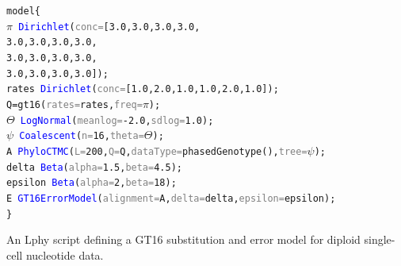 \documentclass[10pt,letterpaper,table]{article}
\theoremstyle{definition}
\begin{document}
\begin{example}[!h]
\small
\begin{alltt}
model \{
  \textcolor{bluishgreen}{\(\pi\)}  ~ \textcolor{blue}{Dirichlet}(\textcolor{gray}{conc=}[\textcolor{constant}{3.0}, \textcolor{constant}{3.0}, \textcolor{constant}{3.0}, \textcolor{constant}{3.0},
  \quad \quad \quad \quad \quad \quad \quad \textcolor{constant}{3.0}, \textcolor{constant}{3.0}, \textcolor{constant}{3.0}, \textcolor{constant}{3.0}, 
  \quad \quad \quad \quad \quad \quad \quad \textcolor{constant}{3.0}, \textcolor{constant}{3.0}, \textcolor{constant}{3.0}, \textcolor{constant}{3.0}, 
  \quad \quad \quad \quad \quad \quad \quad \textcolor{constant}{3.0}, \textcolor{constant}{3.0}, \textcolor{constant}{3.0}, \textcolor{constant}{3.0}]);
  \textcolor{bluishgreen}{rates} ~ \textcolor{blue}{Dirichlet}(\textcolor{gray}{conc=}[\textcolor{constant}{1.0}, \textcolor{constant}{2.0}, \textcolor{constant}{1.0}, \textcolor{constant}{1.0}, \textcolor{constant}{2.0}, \textcolor{constant}{1.0}]);
  Q = \textcolor{generator}{gt16}(\textcolor{gray}{rates=}\textcolor{bluishgreen}{rates}, \textcolor{gray}{freq=}\textcolor{bluishgreen}{\(\pi\)});
  \textcolor{bluishgreen}{\(\Theta\)} ~ \textcolor{blue}{LogNormal}(\textcolor{gray}{meanlog=}\textcolor{constant}{-2.0}, \textcolor{gray}{sdlog=}\textcolor{constant}{1.0});
  \textcolor{bluishgreen}{\(\psi\)} ~ \textcolor{blue}{Coalescent}(\textcolor{gray}{n=}\textcolor{constant}{16}, \textcolor{gray}{theta=}\textcolor{bluishgreen}{\(\Theta\)});
  \textcolor{bluishgreen}{A} ~ \textcolor{blue}{PhyloCTMC}(\textcolor{gray}{L=}\textcolor{constant}{200}, \textcolor{gray}{Q=}Q, \textcolor{gray}{dataType=}\textcolor{generator}{phasedGenotype}(), \textcolor{gray}{tree=}\textcolor{bluishgreen}{\(\psi\)});
  \textcolor{bluishgreen}{delta} ~ \textcolor{blue}{Beta}(\textcolor{gray}{alpha=}\textcolor{constant}{1.5}, \textcolor{gray}{beta=}\textcolor{constant}{4.5});
  \textcolor{bluishgreen}{epsilon} ~ \textcolor{blue}{Beta}(\textcolor{gray}{alpha=}\textcolor{constant}{2}, \textcolor{gray}{beta=}\textcolor{constant}{18});
  \textcolor{bluishgreen}{E} ~ \textcolor{blue}{GT16ErrorModel}(\textcolor{gray}{alignment=}\textcolor{bluishgreen}{A}, \textcolor{gray}{delta=}\textcolor{bluishgreen}{delta}, \textcolor{gray}{epsilon=}\textcolor{bluishgreen}{epsilon});
\}
\end{alltt}
\caption{An Lphy script defining a GT16 substitution and error model for diploid single-cell nucleotide data.}
\label{lphy:phylonco}
\end{example}
\end{document}
